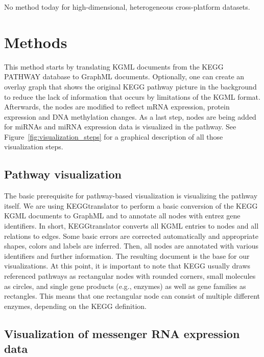 \documentclass{bioinfo}
\begin{document}
No method today for high-dimensional, heterogeneous cross-platform datasets.

\section{Methods}

This method starts by translating KGML documents from the KEGG PATHWAY database to GraphML documents. Optionally, one can create an overlay graph that shows the original KEGG pathway picture in the background to reduce the lack of information that occurs by limitations of the KGML format. Afterwards, the nodes are modified to reflect mRNA expression, protein expression and DNA methylation changes. As a last step, nodes are being added for miRNAs and miRNA expression data is visualized in the pathway. See Figure~\ref{fig:visualization_steps} for a graphical description of all those visualization steps.


\subsection{Pathway visualization}

The basic prerequisite for pathway-based visualization is visualizing the pathway itself. We are using KEGGtranslator \citep[see][]{Wrzodek2011} to perform a basic conversion of the KEGG KGML documents to GraphML and to annotate all nodes with entrez gene identifiers. In short, KEGGtranslator converts all KGML entries to nodes and all relations to edges. Some basic errors are corrected automatically and appropriate shapes, colors and labels are inferred. Then, all nodes are annotated with various identifiers and further information. The resulting document is the base for our visualizations. At this point, it is important to note that KEGG usually draws referenced pathways as rectangular nodes with rounded corners, small molecules as circles, and single gene products (e.g., enzymes) as well as gene families as rectangles. This means that one rectangular node can consist of multiple different enzymes, depending on the KEGG definition.

\subsection{Visualization of messenger RNA expression data}
\end{document}
